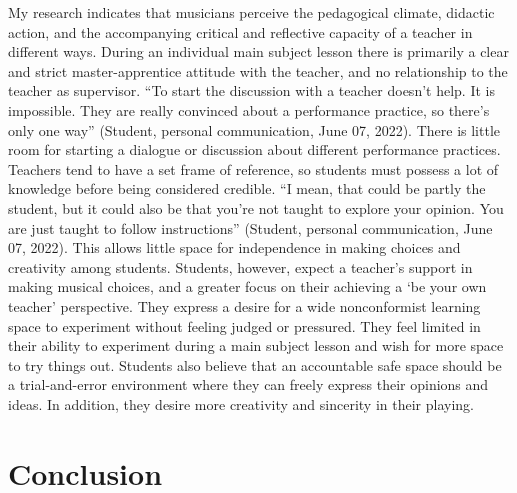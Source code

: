 \documentclass[authordate, empirical, issue]{jote-new-article}
\begin{document}
My research indicates that musicians perceive the pedagogical climate, didactic action, and the accompanying critical and reflective capacity of a teacher in different ways. During an individual main subject lesson there is primarily a clear and strict master-apprentice attitude with the teacher, and no relationship to the teacher as supervisor. “To start the discussion with a teacher doesn't help. It is impossible. They are really convinced about a performance practice, so there's only one way” (Student, personal communication, June 07, 2022). There is little room for starting a dialogue or discussion about different performance practices. Teachers tend to have a set frame of reference, so students must possess a lot of knowledge before being considered credible. “I mean, that could be partly the student, but it could also be that you're not taught to explore your opinion. You are just taught to follow instructions” (Student, personal communication, June 07, 2022). This allows little space for independence in making choices and creativity among students. Students, however, expect a teacher's support in making musical choices, and a greater focus on their achieving a ‘be your own teacher' perspective. They express a desire for a wide nonconformist learning space to experiment without feeling judged or pressured. They feel limited in their ability to experiment during a main subject lesson and wish for more space to try things out. Students also believe that an accountable safe space should be a trial-and-error environment where they can freely express their opinions and ideas. In addition, they desire more creativity and sincerity in their playing.



\section{Conclusion}
\end{document}
